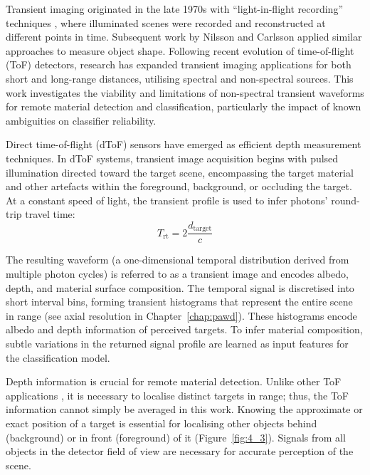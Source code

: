 \documentclass[12pt,a4paper,oneside]{report}
\begin{document}
Transient imaging originated in the late 1970s with ``light-in-flight recording'' techniques \cite{abramson1978,abramson1983}, where illuminated scenes were recorded and reconstructed at different points in time. Subsequent work by Nilsson and Carlsson \cite{nilsson1998} applied similar approaches to measure object shape. Following recent evolution of time-of-flight (ToF) detectors, research has expanded transient imaging applications for both short and long-range distances, utilising spectral and non-spectral sources. This work investigates the viability and limitations of non-spectral transient waveforms for remote material detection and classification, particularly the impact of known ambiguities on classifier reliability.

Direct time-of-flight (dToF) sensors have emerged as efficient depth measurement techniques. In dToF systems, transient image acquisition begins with pulsed illumination directed toward the target scene, encompassing the target material and other artefacts within the foreground, background, or occluding the target. At a constant speed of light, the transient profile is used to infer photons' round-trip travel time:
\begin{equation}
T_{\text{rt}} = 2 \frac{d_{\text{target}}}{c}
\label{eq:round_trip_time}
\end{equation}

The resulting waveform (a one-dimensional temporal distribution derived from multiple photon cycles) is referred to as a transient image and encodes albedo, depth, and material surface composition. The temporal signal is discretised into short interval bins, forming transient histograms that represent the entire scene in range (see axial resolution in Chapter~\ref{chap:pawd}). These histograms encode albedo and depth information of perceived targets. To infer material composition, subtle variations in the returned signal profile are learned as input features for the classification model.

Depth information is crucial for remote material detection. Unlike other ToF applications \cite{tontini2024}, it is necessary to localise distinct targets in range; thus, the ToF information cannot simply be averaged in this work. Knowing the approximate or exact position of a target is essential for localising other objects behind (background) or in front (foreground) of it (Figure~\ref{fig:4_3}). Signals from all objects in the detector field of view are necessary for accurate perception of the scene.
\end{document}
